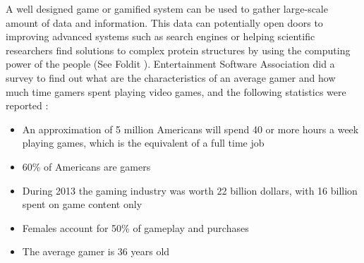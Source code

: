 A well designed game or gamified system can be used to gather large-scale amount of data and information. This data can potentially open doors to improving advanced systems such as search engines or helping scientific researchers find solutions to complex protein structures by using the computing power of the people (See Foldit \cite{53}). Entertainment Software Association did a survey to find out what are the characteristics of an average gamer and how much time gamers spent playing video games, and the following statistics were reported \cite{49}:
\begin{itemize}
    \item An approximation of 5 million Americans will spend 40 or more hours a week playing games, which is the equivalent of a full time job
    \item 60\% of Americans are gamers
    \item During 2013 the gaming industry was worth 22 billion dollars, with 16 billion spent on game content only 
    \item Females account for 50\% of gameplay and purchases
    \item The average gamer is 36 years old
\end{itemize}


